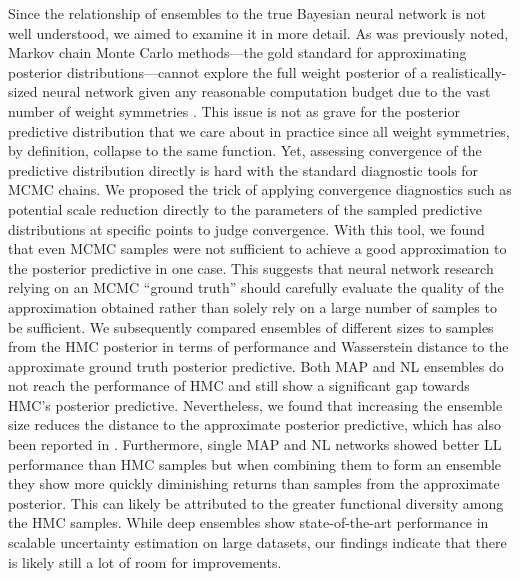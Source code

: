 \documentclass[../thesis.tex]{subfiles}
\begin{document}
Since the relationship of ensembles to the true Bayesian neural network is not well understood, we aimed to examine it in more detail. As was previously noted, Markov chain Monte Carlo methods---the gold standard for approximating posterior distributions---cannot explore the full weight posterior of a realistically-sized neural network given any reasonable computation budget due to the vast number of weight symmetries \parencite{papamarkou2019challenges}. This issue is not as grave for the posterior predictive distribution that we care about in practice since all weight symmetries, by definition, collapse to the same function. Yet, assessing convergence of the predictive distribution directly is hard with the standard diagnostic tools for MCMC chains. We proposed the trick of applying convergence diagnostics such as potential scale reduction directly to the parameters of the sampled predictive distributions at specific points to judge convergence. With this tool, we found that even  MCMC samples were not sufficient to achieve a good approximation to the posterior predictive in one case. This suggests that neural network research relying on an MCMC ``ground truth'' should carefully evaluate the quality of the approximation obtained rather than solely rely on a large number of samples to be sufficient.
We subsequently compared ensembles of different sizes to samples from the HMC posterior in terms of performance and Wasserstein distance to the approximate ground truth posterior predictive. Both MAP and NL ensembles do not reach the performance of HMC and still show a significant gap towards HMC's posterior predictive. Nevertheless, we found that increasing the ensemble size reduces the distance to the approximate posterior predictive, which has also been reported in \textcite{wilson2020bayesian}. Furthermore, single MAP and NL networks showed better LL performance than HMC samples but when combining them to form an ensemble they show more quickly diminishing returns than samples from the approximate posterior. This can likely be attributed to the greater functional diversity among the HMC samples. While deep ensembles show state-of-the-art performance in scalable uncertainty estimation on large datasets, our findings indicate that there is likely still a lot of room for improvements. 

\end{document}
